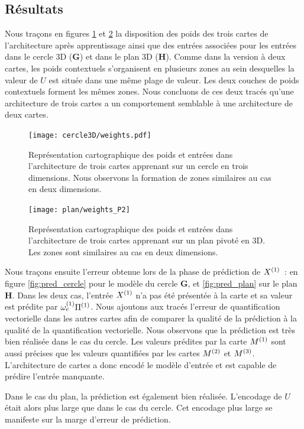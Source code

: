 \documentclass[../main]{subfiles}
\begin{document}
\subsection{Résultats}

Nous traçons en figures \ref{fig:w_cercle} et \ref{fig:w_plan3} la disposition des poids des trois cartes de l'architecture après apprentissage ainsi que des entrées associées pour les entrées dans le cercle 3D (\textbf{G}) et dans le plan 3D (\textbf{H}).
Comme dans la version à deux cartes, les poids contextuels s'organisent en plusieurs zones au sein desquelles la valeur de $U$ est située dans une même plage de valeur. Les deux couches de poids contextuels forment les mêmes zones.
Nous concluons de ces deux tracés qu'une architecture de trois cartes a un comportement semblable à une architecture de deux cartes.

\begin{figure}[h!]
	\centering\texttt{[image: cercle3D/weights.pdf]}
	\caption{Représentation cartographique des poids et entrées dans l'architecture de trois cartes apprenant sur un cercle en trois dimensions. Nous observons la formation de zones similaires au cas en deux dimensions. \label{fig:w_cercle}}
\end{figure}

\begin{figure}[h!]
	\centering\texttt{[image: plan/weights\_P2]}
	\caption{Représentation cartographique des poids et entrées dans l'architecture de trois cartes apprenant sur un plan pivoté en 3D. Les zones sont similaires au cas en deux dimensions. \label{fig:w_plan3}}
\end{figure}

Nous traçons ensuite l'erreur obtenue lors de la phase de prédiction de $X^{({1})}$~: en figure \ref{fig:pred_cercle} pour le modèle du cercle \textbf{G}, et \ref{fig:pred_plan} sur le plan \textbf{H}.
Dans les deux cas, l'entrée $X^{({1})}$ n'a pas été présentée à la carte et sa valeur est prédite par $\omega_{e}^{({1})}{\Pi^{({1})}}$. Nous ajoutons aux tracés l'erreur de quantification vectorielle dans les autres cartes afin de comparer la qualité de la prédiction à la qualité de la quantification vectorielle.
Nous observons que la prédiction est très bien réalisée dans le cas du cercle. Les valeurs prédites par la carte $M^{({1})}$ sont aussi précises que les valeurs quantifiées par les cartes $M^{({2})}$ et $M^{({3})}$.
L'architecture de cartes a donc encodé le modèle d'entrée et est capable de prédire l'entrée manquante.

Dans le cas du plan, la prédiction est également bien réalisée. L'encodage de $U$ était alors plus large que dans le cas du cercle. Cet encodage plus large se manifeste sur la marge d'erreur de prédiction.
\end{document}
